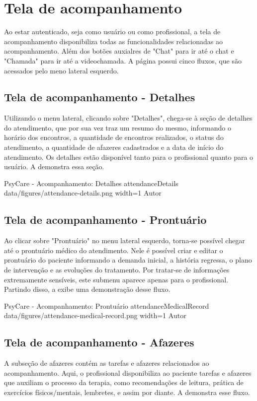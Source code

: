 \section{Tela de acompanhamento}
\label{sec:acompanhamento}

Ao estar autenticado, seja como usuário ou como profissional, a tela de acompanhamento disponibiliza todas as funcionalidades relacionadas ao acompanhamento. Além dos botões auxialres de "Chat"  para ir até o chat e "Chamada" para ir até a videochamada. A página possui cinco fluxos, que são acessados pelo meno lateral esquerdo.

\subsection{Tela de acompanhamento - Detalhes}
\label{sec:acompanhamentoDetalhes}
Utilizando o menu lateral, clicando sobre "Detalhes", chega-se à seção de detalhes do atendimento, que por sua vez traz um resumo do mesmo, informando o horário dos encontros, a quantidade de encontros realizados, o status do atendimento, a quantidade de afazeres cadastrados e a data de início do atendimento. Os detalhes estão disponível tanto para o profissional quanto para o usuário. A  demonstra essa seção.

\image
    {PsyCare - Acompanhamento: Detalhes}
    {attendanceDetails}
    {data/figures/attendance-details.png}
    {width=1\textwidth}
    {Autor}

\subsection{Tela de acompanhamento - Prontuário}
\label{sec:acompanhamentoProntuario}
Ao clicar sobre "Prontuário" no menu lateral esquerdo, torna-se possível chegar até o prontuário médico do atendimento. Nele é possível criar e editar o prontuário do paciente informando a demanda inicial, a história regressa, o plano de intervenção e as evoluções do tratamento. Por tratar-se de informações extremamente sensíveis, este submenu aparece apenas para o profissional. Partindo disso, a  exibe uma demonstração desse fluxo.

\image
    {PsyCare - Acompanhamento: Prontuário}
    {attendanceMedicalRecord}
    {data/figures/attendance-medical-record.png}
    {width=1\textwidth}
    {Autor}

\subsection{Tela de acompanhamento - Afazeres}
\label{sec:acompanhamentoAfazeres}
A subseção de afazeres contém as tarefas e afazeres relacionados ao acompanhamento. Aqui, o profissional disponibiliza ao paciente tarefas e afazeres que auxiliam o processo da terapia, como recomendações de leitura, prática de exercícios físicos/mentais, lembretes, e assim por diante. A  demonstra esse fluxo.

